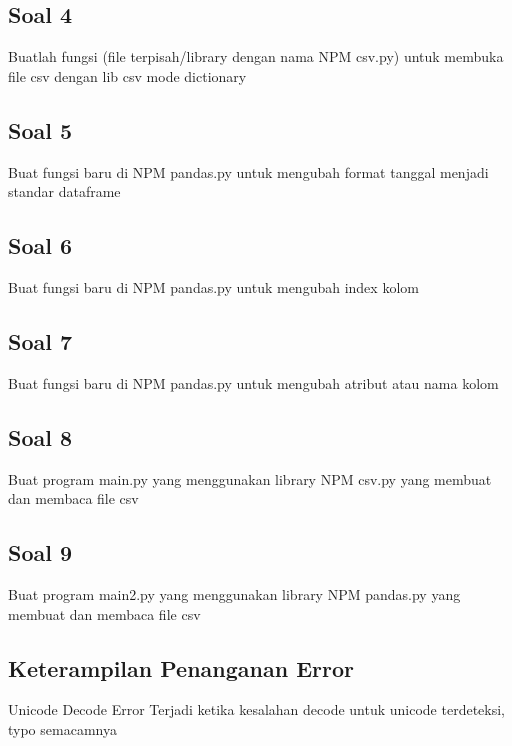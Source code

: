 \subsection{Soal 4}
Buatlah fungsi (file terpisah/library dengan nama NPM csv.py) untuk membuka file csv dengan lib csv mode dictionary


\subsection{Soal 5}
Buat fungsi baru di NPM pandas.py untuk mengubah format tanggal menjadi
standar dataframe


\subsection{Soal 6}
Buat fungsi baru di NPM pandas.py untuk mengubah index kolom


\subsection{Soal 7}
Buat fungsi baru di NPM pandas.py untuk mengubah atribut atau nama kolom


\subsection{Soal 8}
Buat program main.py yang menggunakan library NPM csv.py yang membuat
dan membaca file csv




\subsection{Soal 9}
Buat program main2.py yang menggunakan library NPM pandas.py yang membuat dan membaca file csv




\subsection{Keterampilan Penanganan Error}
Unicode Decode Error
Terjadi ketika kesalahan decode untuk unicode terdeteksi, typo semacamnya






